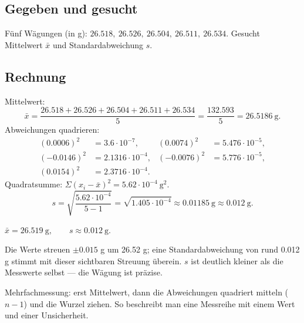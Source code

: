 
\subsection*{Gegeben und gesucht}
Fünf Wägungen (in g): $26.518,\ 26.526,\ 26.504,\ 26.511,\ 26.534$. Gesucht
Mittelwert $\bar x$ und Standardabweichung $s$.

\subsection*{Rechnung}
Mittelwert:
\begin{equation}
  \bar x = \frac{26.518+26.526+26.504+26.511+26.534}{5}
  = \frac{132.593}{5} = 26.5186\ \mathrm{g}.
\end{equation}
Abweichungen quadrieren:
\begin{align*}
  (0.0006)^2 &= 3.6\cdot10^{-7}, &
  (0.0074)^2 &= 5.476\cdot10^{-5}, \\
  (-0.0146)^2 &= 2.1316\cdot10^{-4}, &
  (-0.0076)^2 &= 5.776\cdot10^{-5}, \\
  (0.0154)^2 &= 2.3716\cdot10^{-4}.
\end{align*}
Quadratsumme: $\Sigma(x_i-\bar x)^2 = 5.62\cdot10^{-4}\ \mathrm{g^2}$.
\begin{equation}
  s = \sqrt{\frac{5.62\cdot10^{-4}}{5-1}} = \sqrt{1.405\cdot10^{-4}}
  \approx 0.01185\ \mathrm{g} \approx 0.012\ \mathrm{g}.
\end{equation}

\begin{ergebnis}
$\bar x = 26.519\ \mathrm{g},\qquad s \approx 0.012\ \mathrm{g}.$
\end{ergebnis}

\begin{kontrolle}
Die Werte streuen $\pm 0.015$ g um 26.52 g; eine Standardabweichung von
rund 0.012 g stimmt mit dieser sichtbaren Streuung überein. $s$ ist deutlich
kleiner als die Messwerte selbst --- die Wägung ist präzise.
\end{kontrolle}

\begin{merksatz}
Mehrfachmessung: erst Mittelwert, dann die Abweichungen quadriert mitteln
($n-1$) und die Wurzel ziehen. So beschreibt man eine Messreihe mit einem
Wert und einer Unsicherheit.
\end{merksatz}
